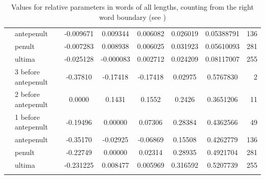 \documentclass[output=paper]{LSP/langsci}
\begin{document}
\begin{table}
\begin{tabular}{ll *{5}{S[table-format=1.8,group-digits=false]}r}
                                                                & antepenult                & -0.009671      & 0.009344   & 0.006082   & 0.026019       & 0.05388791 & 136                          \\
                                                                & penult                    & -0.007283      & 0.008938   & 0.006025   & 0.031923       & 0.05610093 & 281                          \\
                                                                & ultima                    & -0.025128      & -0.000083  & 0.002712   & 0.024209       & 0.08117007 & 255                          \\
\midrule
{}                                                     & 3 before antepenult       & -0.37810       & -0.17418   & -0.17418   & 0.02975        & 0.5767830  & 2                            \\
                                                                & 2 before antepenult       & 0.0000         & 0.1431     & 0.1552     & 0.2426         & 0.3651206  & 11                           \\
                                                                & 1 before antepenult       & -0.19496       & 0.00000    & 0.07306    & 0.28384        & 0.4362566  & 49                           \\
                                                                & antepenult                & -0.35170       & -0.02925   & -0.06869   & 0.15508        & 0.4262779  & 136                          \\
                                                                & penult                    & -0.22749       & 0.00000    & 0.02314    & 0.28935        & 0.4921704  & 281                          \\
                                                                & ultima                    & -0.231225      & 0.008477   & 0.005969   & 0.316592       & 0.5207739  & 255                         \\
\lspbottomrule
\end{tabular}
\caption{Values for relative parameters in words of all lengths, counting from the right word boundary (see )}
\label{tab:buc:1}
\end{table}
\end{document}
